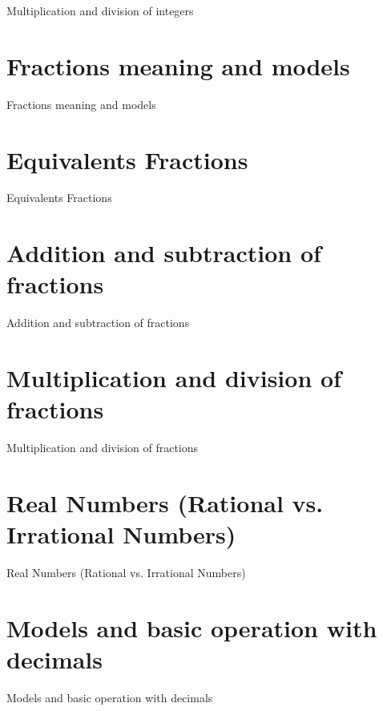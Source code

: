 Multiplication and division of integers

\section{Fractions meaning and models}
\label{sec:fractions-meaning-and-models}

Fractions meaning and models

\section{Equivalents Fractions}
\label{sec:equivalents-fractions}

Equivalents Fractions

\section{Addition and subtraction of fractions}
\label{sec:addition-and-subtraction-of-fractions}

Addition and subtraction of fractions

\section{Multiplication and division of fractions}
\label{sec:multiplication-and-division-of-fractions}

Multiplication and division of fractions

\section{Real Numbers (Rational vs. Irrational Numbers)}
\label{sec:real-numbers-rational-vs-irrational-numbers}

Real Numbers (Rational vs. Irrational Numbers)

\section{Models and basic operation with decimals}
\label{sec:models-and-basic-operation-with-decimals}

Models and basic operation with decimals

